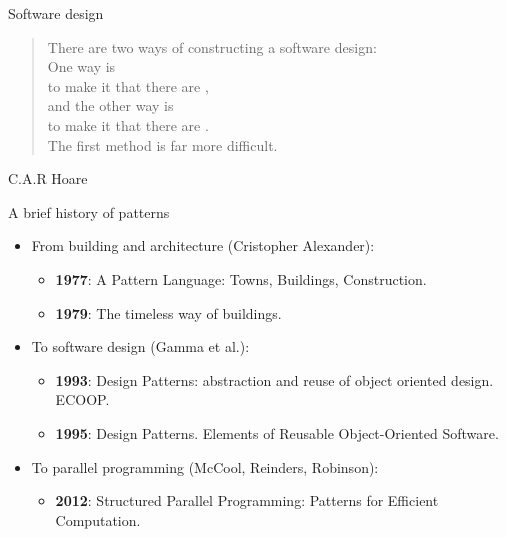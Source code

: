 \begin{frame}[t]{Software design}

\begin{quote}
There are two ways of constructing a software design:\\ 
\vspace{1em}
\pause
One way is\\
\pause
to make it  that there are ,\\
\pause
\vspace{.5em}
and the other way is\\
\pause
to make it  that there are .\\ 
\vspace{1em}
\pause
The first method is far more difficult. 
\end{quote}
\hfill C.A.R Hoare
\end{frame}

\begin{frame}[t]{A brief history of patterns}
\begin{itemize}
\item From building and architecture (Cristopher Alexander):
\begin{itemize}
  \item \textbf{1977}: A Pattern Language: Towns, Buildings, Construction.
  \item \textbf{1979}: The timeless way of buildings.
\end{itemize}
\vfill
\item To software design (Gamma et al.):
\begin{itemize}
  \item \textbf{1993}: Design Patterns: abstraction and reuse of object oriented design. ECOOP.
  \item \textbf{1995}: Design Patterns. Elements of Reusable Object-Oriented Software.
\end{itemize}
\vfill
\item To parallel programming (McCool, Reinders, Robinson):
\begin{itemize}
  \item \textbf{2012}: Structured Parallel Programming: Patterns for Efficient Computation.
\end{itemize}
\end{itemize}
\end{frame}
